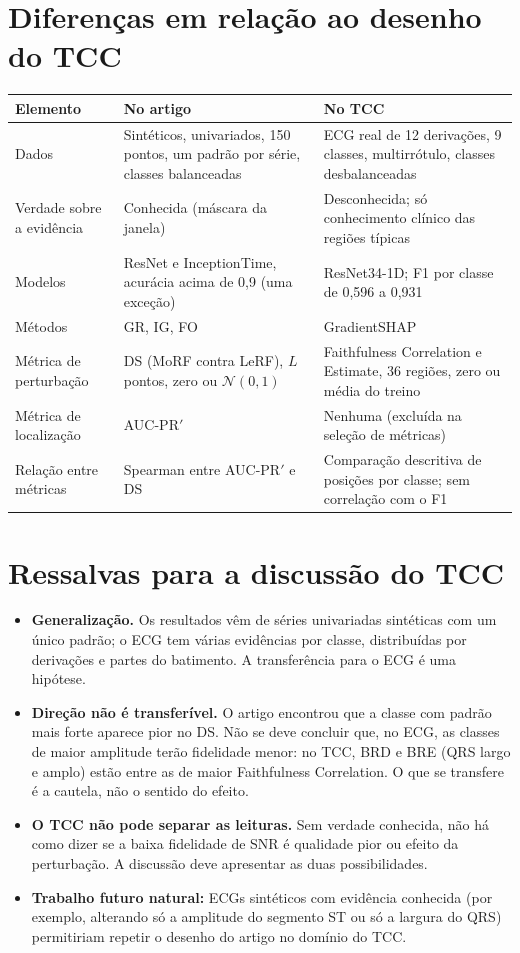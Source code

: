 \documentclass[11pt,a4paper]{article}
\begin{document}
\section{Diferenças em relação ao desenho do TCC}
\begin{center}\small
\begin{tabularx}{\linewidth}{lXX}
\toprule
\textbf{Elemento} & \textbf{No artigo} & \textbf{No TCC} \\
\midrule
Dados & Sintéticos, univariados, 150 pontos, um padrão por série, classes balanceadas & ECG real de 12 derivações, 9 classes, multirrótulo, classes desbalanceadas \\ \addlinespace
Verdade sobre a evidência & Conhecida (máscara da janela) & Desconhecida; só conhecimento clínico das regiões típicas \\ \addlinespace
Modelos & ResNet e InceptionTime, acurácia acima de 0,9 (uma exceção) & ResNet34-1D; F1 por classe de 0,596 a 0,931 \\ \addlinespace
Métodos & GR, IG, FO & GradientSHAP \\ \addlinespace
Métrica de perturbação & DS (MoRF contra LeRF), $L$ pontos, zero ou $\mathcal{N}(0,1)$ & Faithfulness Correlation e Estimate, 36 regiões, zero ou média do treino \\ \addlinespace
Métrica de localização & AUC-PR$'$ & Nenhuma (excluída na seleção de métricas) \\ \addlinespace
Relação entre métricas & Spearman entre AUC-PR$'$ e DS & Comparação descritiva de posições por classe; sem correlação com o F1 \\
\bottomrule
\end{tabularx}
\end{center}

\section{Ressalvas para a discussão do TCC}
\begin{itemize}
\item \textbf{Generalização.} Os resultados vêm de séries univariadas sintéticas com um único padrão; o ECG tem várias evidências por classe, distribuídas por derivações e partes do batimento. A transferência para o ECG é uma hipótese.
\item \textbf{Direção não é transferível.} O artigo encontrou que a classe com padrão mais forte aparece pior no DS. Não se deve concluir que, no ECG, as classes de maior amplitude terão fidelidade menor: no TCC, BRD e BRE (QRS largo e amplo) estão entre as de maior Faithfulness Correlation. O que se transfere é a cautela, não o sentido do efeito.
\item \textbf{O TCC não pode separar as leituras.} Sem verdade conhecida, não há como dizer se a baixa fidelidade de SNR é qualidade pior ou efeito da perturbação. A discussão deve apresentar as duas possibilidades.
\item \textbf{Trabalho futuro natural:} ECGs sintéticos com evidência conhecida (por exemplo, alterando só a amplitude do segmento ST ou só a largura do QRS) permitiriam repetir o desenho do artigo no domínio do TCC.
\end{itemize}
\end{document}
